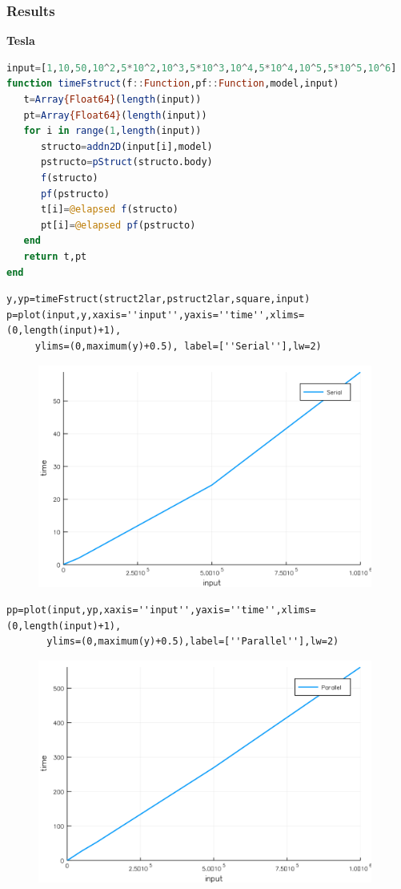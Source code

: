 \documentclass[a4paper,12pt]{article}
\begin{document}
\subsubsection{Results}
\textbf{Tesla}
\begin{lstlisting}[language=Julia]
input=[1,10,50,10^2,5*10^2,10^3,5*10^3,10^4,5*10^4,10^5,5*10^5,10^6]
function timeFstruct(f::Function,pf::Function,model,input)
   t=Array{Float64}(length(input))
   pt=Array{Float64}(length(input))
   for i in range(1,length(input))
      structo=addn2D(input[i],model)
      pstructo=pStruct(structo.body)
      f(structo)
      pf(pstructo)
      t[i]=@elapsed f(structo)
      pt[i]=@elapsed pf(pstructo)
   end
   return t,pt
end
\end{lstlisting}
\newpage
\begin{verbatim}
y,yp=timeFstruct(struct2lar,pstruct2lar,square,input)
p=plot(input,y,xaxis=''input'',yaxis=''time'',xlims=(0,length(input)+1),
     ylims=(0,maximum(y)+0.5), label=[''Serial''],lw=2)
\end{verbatim}
\begin{figure}[ht!]
\centering
\includegraphics[width=11cm,scale=0.3]{struct2lar.png}
\end{figure}
\begin{verbatim}
pp=plot(input,yp,xaxis=''input'',yaxis=''time'',xlims=(0,length(input)+1),
       ylims=(0,maximum(y)+0.5),label=[''Parallel''],lw=2)
\end{verbatim}
\begin{figure}[ht!]
\centering
\includegraphics[width=11cm,scale=0.3]{pstruct2lar.png}
\end{figure}
\end{document}
